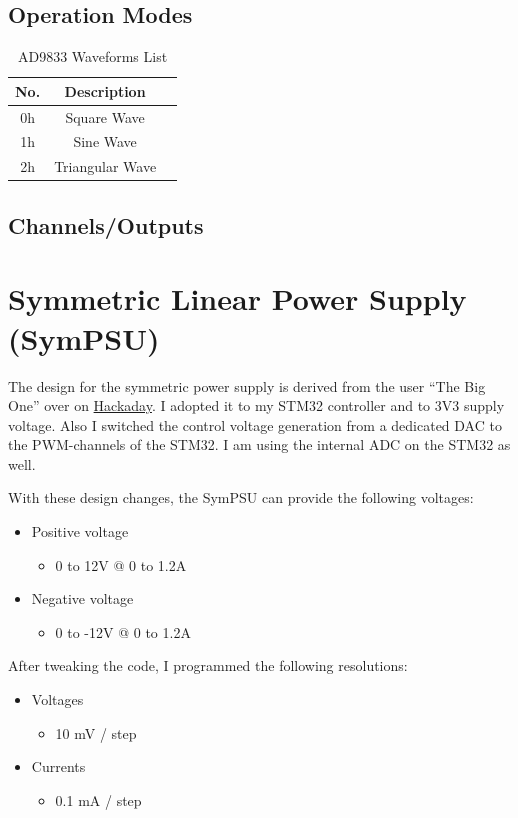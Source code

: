 \subsection{Operation Modes}
\begin{table}[H]
    \centering
    \begin{tabular}{|c|c|l|}
        \hline
        \textbf{No.}   & \multicolumn{1}{|c|}{\textbf{Description}}\\ \hline \hline
        0h   &  Square Wave\\ \hline
		1h   &  Sine Wave\\ \hline
		2h	 &  Triangular Wave \\ \hline
    \end{tabular}
	\caption{AD9833 Waveforms List}
\label{tab:mode-Waveform9833}
\subsection{Channels/Outputs}
\section{Symmetric Linear Power Supply (SymPSU)}
The design for the symmetric power supply is derived from the user ``The Big One'' over on \textcolor{blue}{\href{https://hackaday.io/project/4154-bench-power-supply}{Hackaday}}. I adopted it to my STM32 controller and to 3V3 supply voltage. Also I switched the control voltage generation from a dedicated DAC to the PWM-channels of the STM32. I am using the internal ADC on the STM32 as well. 

With these design changes, the SymPSU can provide the following voltages:
\begin{itemize}
	\item Positive voltage
	\begin{itemize}
		\item 0 to 12V @ 0 to 1.2A
	\end{itemize}
	\item Negative voltage
	\begin{itemize}
		\item 0 to -12V @ 0 to 1.2A
	\end{itemize}
\end{itemize}

After tweaking the code, I programmed the following resolutions:

\begin{itemize}
	\item Voltages
	\begin{itemize}
		\item 10 mV / step
	\end{itemize}
	\item Currents
	\begin{itemize}
		\item 0.1 mA / step
	\end{itemize}
\end{itemize}


\end{table}
